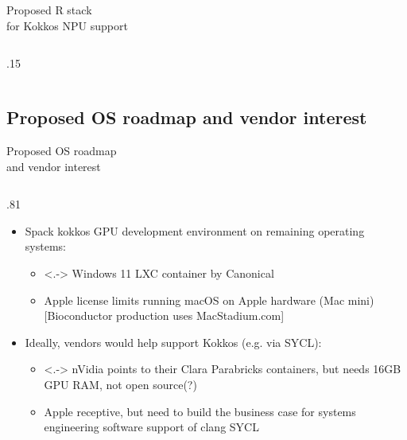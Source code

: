 \documentclass[
aspectratio=169,
xcolor={usenames}
]{beamer}
\begin{document}
\begin{frame}{\hspace{8cm}Proposed R stack\\%
    \hspace{8cm}for Kokkos NPU support}
\begin{columns}[T]
\begin{column}{.15\framewidth}
    \end{column}
  \end{columns}
\end{frame}

\subsection{Proposed OS roadmap  and vendor interest}
\begin{frame}{\hspace{8cm}Proposed OS roadmap\\%
    \hspace{8cm}and vendor interest}
  \begin{columns}[T]
    \begin{column}{.81\framewidth}
      \begin{itemize}[<+->]
      \item Spack kokkos GPU development environment %
        on remaining operating systems:
        \begin{itemize}
        \item<.-> Windows 11 LXC container by Canonical
        \item Apple license %
          limits running macOS on Apple hardware (Mac mini) %
          [Bioconductor production uses MacStadium.com]\footnotemark[2]
        \end{itemize}
      \item Ideally, vendors would help support Kokkos (e.g. via SYCL):
        \begin{itemize}
        \item<.-> nVidia points to their Clara Parabricks containers, %
          but needs 16GB GPU RAM, not open source(?)
        \item Apple receptive, %
          but need to build the business case %
          for systems engineering software support of clang SYCL
        \end{itemize}
      \end{itemize}
    \end{column}

\end{columns}
\end{frame}
\end{document}
